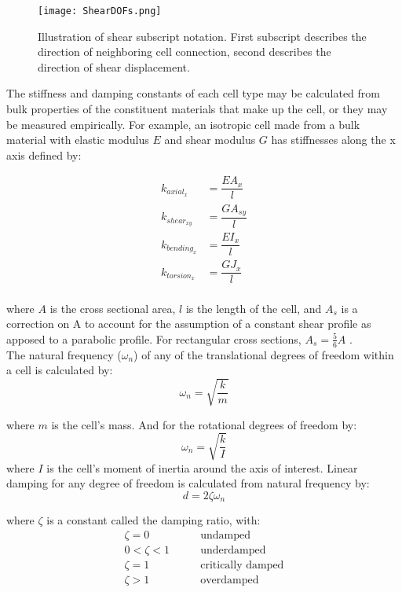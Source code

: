 {\begin{figure}
  \texttt{[image: ShearDOFs.png]}
  \caption{Illustration of shear subscript notation.  First subscript describes the direction of neighboring cell connection, second describes the direction of shear displacement.}
  \label{fig:ShearDOFs}
\end{figure}

The stiffness and damping constants of each cell type may be calculated from bulk properties of the constituent materials that make up the cell, or they may be measured empirically.  For example, an isotropic cell made from a bulk material with elastic modulus $E$ and shear modulus $G$ has stiffnesses along the x axis defined by:

\begin{subequations}
\begin{align} 
\label{eq:kaxial}
k_{axial_x} &= \dfrac{EA_x}{l}\\[10pt]
\label{eq:kshear}
k_{shear_{xy}} &= \dfrac{GA_{sy}}{l}\\[10pt]
\label{eq:kbending}
k_{bending_x} &= \dfrac{EI_x}{l}\\[10pt]
\label{eq:ktorsion}
k_{torsion_x} &= \dfrac{GJ_x}{l}
\end{align}
\end{subequations}
\\
where $A$ is the cross sectional area, $l$ is the length of the cell, and $A_{s}$ is a correction on A to account for the assumption of a constant shear profile as apposed to a parabolic profile.  For rectangular cross sections, $A_s = \tfrac{5}{6}A$ \cite{Cowper2016}.\\

The natural frequency ($\omega_n$) of any of the translational degrees of freedom within a cell is calculated by:
\begin{equation}\label{eq:natFreq}
 \omega_n = \sqrt{\dfrac{k}{m}}
 \end{equation}

where $m$ is the cell's mass.  And for the rotational degrees of freedom by:
\begin{equation}\label{eq:natFreqRot}
 \omega_n = \sqrt{\dfrac{k}{I}}
 \end{equation}
 where $I$ is the cell's moment of inertia around the axis of interest.  Linear damping for any degree of freedom is calculated from natural frequency by:
\[ d = 2\zeta \omega_n \]

where $\zeta$ is a constant called the damping ratio, with:
\begin{subequations}
\begin{align*}
\zeta = 0 \qquad &\text{undamped}\\
0 < \zeta < 1 \qquad &\text{underdamped}\\
\zeta = 1 \qquad &\text{critically damped}\\
\zeta > 1 \qquad &\text{overdamped}\\
\end{align*}
\end{subequations}

}
